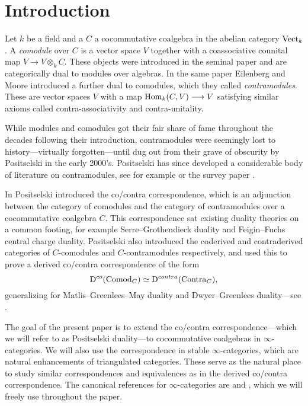 
\section{Introduction}

Let $k$ be a field and a $C$ a cocommutative coalgebra in the abelian category $\mathrm{Vect}_k$. A \emph{comodule} over $C$ is a vector space $V$ together with a coassociative counital map $V\to V\otimes_k C$. These objects were introduced in the seminal paper \cite{eilenberg-moore_65} and are categorically dual to modules over algebras. In the same paper Eilenberg and Moore introduced a further dual to comodules, which they called \emph{contramodules}. These are vector spaces $V$ with a map $\operatorname{Hom}_k(C, V)\longrightarrow V$ satisfying similar axioms called contra-associativity and contra-unitality. 

While modules and comodules got their fair share of fame throughout the decades following their introduction, contramodules were seemingly lost to history---virtually forgotten---until dug out from their grave of obscurity by Positselski in the early 2000's. Positselski has since developed a considerable body of literature on contramodules, see for example \cite{positselski_2010, positselski_2011, positselski_2016, positselski_2017_contraadjusted, positselski_2020} or the survey paper \cite{positselski_2022_contramodules}. 

In \cite{positselski_2010} Positselski introduced the co/contra correspondence, which is an adjunction between the category of comodules and the category of contramodules over a cocommutative coalgebra $C$. This correspondence sat existing duality theories on a common footing, for example Serre--Grothendieck duality and Feigin--Fuchs central charge duality. Positselski also introduced the coderived and contraderived categories of $C$-comodules and $C$-contramodules respectively, and used this to prove a derived co/contra correspondence of the form 
\[\mathrm{D}^{co}(\mathrm{Comod}_C)\simeq \mathrm{D}^{contra}(\mathrm{Contra}_C),\]
generalizing for Matlis--Greenlees--May duality and Dwyer--Greenlees duality---see \cite{positselski_2016}. 

The goal of the present paper is to extend the co/contra correspondence---which we will refer to as Positselski duality---to cocommutative coalgebras in $\infty$-categories. We will also use the correspondence in stable $\infty$-categories, which are natural enhancements of triangulated categories. These serve as the natural place to study similar correspondences and equivalences as in the derived co/contra correspondence. The canonical references for $\infty$-categories are \cite{lurie_09} and \cite{Lurie_HA}, which we will freely use throughout the paper. 




